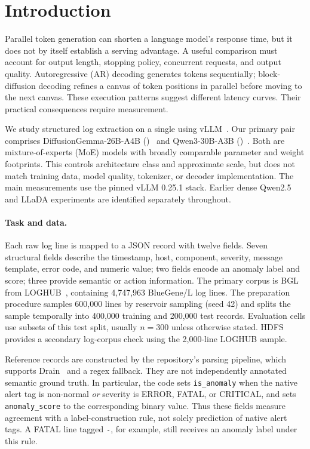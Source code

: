 \section{Introduction}
\label{sec:intro}

Parallel token generation can shorten a language model's response time,
but it does not by itself establish a serving advantage. A useful comparison
must account for output length, stopping policy, concurrent requests, and
output quality. Autoregressive (AR) decoding generates tokens sequentially;
block-diffusion decoding refines a canvas of token positions in parallel
before moving to the next canvas. These execution patterns suggest different
latency curves. Their practical consequences require measurement.

We study structured log extraction on a single \gpuModel{} using
vLLM~\cite{vllm2023}. Our primary pair comprises
DiffusionGemma-26B-A4B (\DG)~\cite{diffusiongemma} and
Qwen3-30B-A3B (\ARthree)~\cite{qwen3}. Both are mixture-of-experts
(MoE) models with broadly comparable parameter and weight footprints.
This controls architecture class and approximate scale, but does not match
training data, model quality, tokenizer, or decoder implementation.
The main measurements use the pinned vLLM 0.25.1 stack. Earlier dense
Qwen2.5 and LLaDA experiments are identified separately throughout.

\paragraph{Task and data.}
Each raw log line is mapped to a JSON record with twelve fields. Seven
structural fields describe the timestamp, host, component, severity,
message template, error code, and numeric value; two fields encode an
anomaly label and score; three provide semantic or action information.
The primary corpus is BGL from LOGHUB~\cite{loghub}, containing
4{,}747{,}963 BlueGene/L log lines. The preparation procedure samples
600{,}000 lines by reservoir sampling (seed 42) and splits the sample
temporally into 400{,}000 training and 200{,}000 test records.
Evaluation cells use subsets of this test split, usually $n{=}300$ unless
otherwise stated. HDFS provides a secondary log-corpus check using the
2{,}000-line LOGHUB sample.

Reference records are constructed by the repository's parsing pipeline,
which supports Drain~\cite{drain} and a regex fallback. They are not
independently annotated semantic ground truth. In particular, the code
sets \texttt{is\_anomaly} when the native alert tag is non-normal
\emph{or} severity is ERROR, FATAL, or CRITICAL, and sets
\texttt{anomaly\_score} to the corresponding binary value. Thus these
fields measure agreement with a label-construction rule, not solely
prediction of native alert tags. A FATAL line tagged \texttt{-}, for
example, still receives an anomaly label under this rule.

